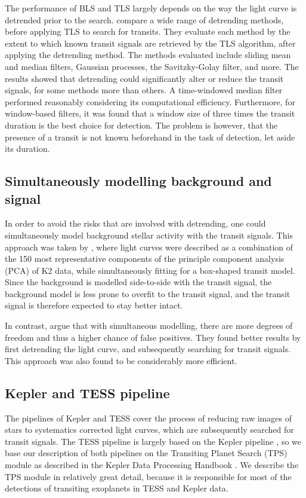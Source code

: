 The performance of BLS and TLS largely depends on the way the light curve is detrended prior to the search. \cite{hippke2019wotan} compare a wide range of detrending methods, before applying TLS to search for transits. They evaluate each method by the extent to which known transit signals are retrieved by the TLS algorithm, after applying the detrending method. The methods evaluated include sliding mean and median filters, Gaussian processes, the Savitzky-Golay filter, and more. The results showed that detrending could significantly alter or reduce the transit signals, for some methods more than others. A time-windowed median filter performed reasonably considering its computational efficiency. Furthermore, for window-based filters, it was found that a window size of three times the transit duration is the best choice for detection. The problem is however, that the presence of a transit is not known beforehand in the task of detection, let aside its duration.

\subsection{Simultaneously modelling background and signal}

In order to avoid the risks that are involved with detrending, one could simultaneously model background stellar activity with the transit signals. This approach was taken by \cite{foreman2015systematic}, where light curves were described as a combination of the 150 most representative components of the principle component analysis (PCA) of K2 data, while simultaneously fitting for a box-shaped transit model. Since the background is modelled side-to-side with the transit signal, the background model is less prone to overfit to the transit signal, and the transit signal is therefore expected to stay better intact.

In contrast, \cite{kovacs2016periodic} argue that with simultaneous modelling, there are more degrees of freedom and thus a higher chance of false positives. They found better results by first detrending the light curve, and subsequently searching for transit signals. This approach was also found to be considerably more efficient.

\subsection{Kepler and TESS pipeline}

The pipelines of Kepler and TESS cover the process of reducing raw images of stars to systematics corrected light curves, which are subsequently searched for transit signals. The TESS pipeline is largely based on the Kepler pipeline \citep{jenkins2016tess}, so we base our description of both pipelines on the Transiting Planet Search (TPS) module as described in the Kepler Data Processing Handbook \citep{jenkins2017kepler}. We describe the TPS module in relatively great detail, because it is responsible for most of the detections of transiting exoplanets in TESS and Kepler data.

